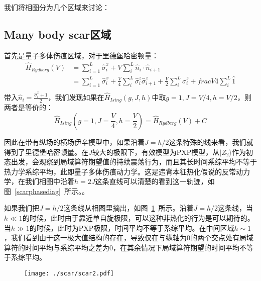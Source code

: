 我们将相图分为几个区域来讨论：


\subsection{Many body scar区域}
首先是量子多体伤痕区域，对于里德堡哈密顿量：
\begin{equation}
\begin{split}
	\hat{H}_{Rydberg}(V) &= \sum_{i=1}^{L} \hat{\sigma}_{i}^{x} + V \sum_{i}^{L} \hat{n}_i\cdot\hat{n}_{i+1} \\
	\quad &= \sum_{i=1}^{L} \hat{\sigma}_{i}^{x} + \frac{V}{4}  \sum_{i}^L \hat{\sigma}_i^z\hat{\sigma}_{i+1}^z + \frac{V}{2} \sum_i^L \hat{\sigma}_i^z  + frac{V}{4} \sum_i^L \hat{1} \\
\end{split}
\end{equation}
带入$\hat{n}_i = \frac{\hat{\sigma}_i^z+1}{2}$，我们发现如果在$\hat{H}_{Ising}(g,J,h)$中取$g=1,J=V/4,h=V/2$，则两者是等价的：
\begin{equation}
\hat{H}_{Ising}(g=1,J=\frac{V}{4},h=\frac{V}{2}) = \hat{H}_{Rydberg}(V) + C
\end{equation}

因此在带有纵场的横场伊辛模型中，如果沿着$J=h/2$这条特殊的线来看，我们就得到了里德堡哈密顿量。在$J$较大的极限下，有效模型为PXP模型，从$|Z_2\rangle$作为初态出发，会观察到局域算符期望值的持续震荡行为，而且其长时间系综平均不等于热力学系综平均，此即量子多体伤痕动力学。这是违背本征热化假说的反常动力学，在我们相图中沿着$h=2J$这条直线可以清楚的看到这一轨迹，如图~\ref{scarphasediag}~所示。。

如果我们把$J=h/2$这条线从相图里摘出，如图~\ref{scar1_2}~所示。沿着$J=h/2$这条线，当$h\ll 1$的时候，此时由于靠近单自旋极限，可以这种非热化的行为是可以期待的。当$h \gg 1$的时候，此时为PXP极限，时间平均不等于系综平均。在中间区域$h\sim 1$，我们看到由于这一极大值结构的存在，导致仅在与纵轴为0的两个交点处有局域算符的时间平均与系综平均之差为0，在其余情况下局域算符期望的时间平均不等于系综平均。

\begin{figure}[h]
\centering
\texttt{[image: ./scar/scar2.pdf]}
\label{scar1_2}
\end{figure}


